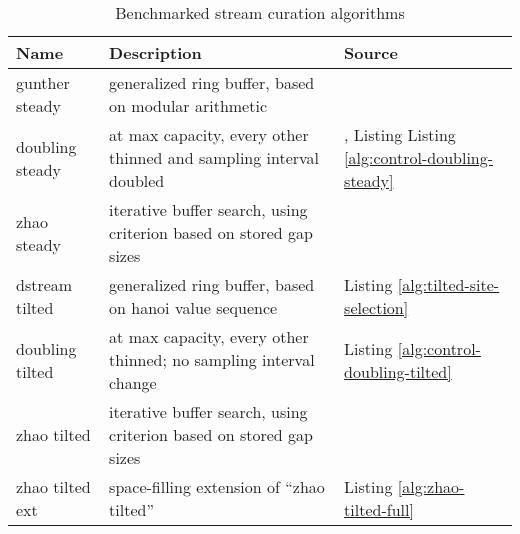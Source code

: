 \begin{table*}[]
\begin{tabular}{lll}
\hline
Name            & Description                                                        & Source                                                   \\ \hline
gunther steady  & generalized ring buffer, based on modular arithmetic               & \citep{gunther2014algorithm}          \\
doubling steady & at max capacity, every other thinned and sampling interval doubled & \citep{gunther2014algorithm}, Listing Listing \ref{alg:control-doubling-steady}          \\
zhao steady     & iterative buffer search, using criterion based on stored gap sizes & \citep[Fig.~6]{zhao2005generalized}  \\
dstream tilted  & generalized ring buffer, based on hanoi value sequence             & Listing \ref{alg:tilted-site-selection} \\
doubling tilted & at max capacity, every other thinned; no sampling interval change  & Listing \ref{alg:control-doubling-tilted}                         \\
zhao tilted     & iterative buffer search, using criterion based on stored gap sizes & \citep[Fig.~10]{zhao2005generalized} \\
zhao tilted ext  & space-filling extension of ``zhao tilted'' & Listing \ref{alg:zhao-tilted-full}
\end{tabular}
\caption{Benchmarked stream curation algorithms}
\label{tab:algorithms}
\end{table*}
